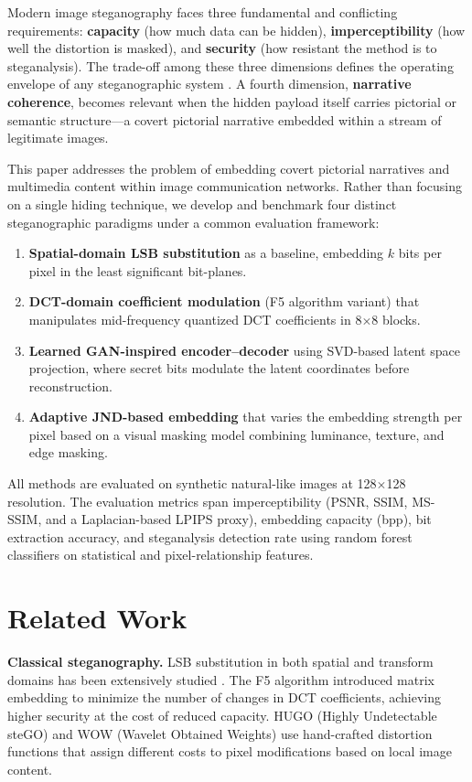 \documentclass[conference]{IEEEtran}
\begin{document}
Modern image steganography faces three fundamental and conflicting requirements: \textbf{capacity} (how much data can be hidden), \textbf{imperceptibility} (how well the distortion is masked), and \textbf{security} (how resistant the method is to steganalysis). The trade-off among these three dimensions defines the operating envelope of any steganographic system \cite{5}. A fourth dimension, \textbf{narrative coherence}, becomes relevant when the hidden payload itself carries pictorial or semantic structure---a covert pictorial narrative embedded within a stream of legitimate images.

This paper addresses the problem of embedding covert pictorial narratives and multimedia content within image communication networks. Rather than focusing on a single hiding technique, we develop and benchmark four distinct steganographic paradigms under a common evaluation framework:

\begin{enumerate}
    \item \textbf{Spatial-domain LSB substitution} as a baseline, embedding $k$ bits per pixel in the least significant bit-planes.
    \item \textbf{DCT-domain coefficient modulation} (F5 algorithm variant) that manipulates mid-frequency quantized DCT coefficients in 8$\times$8 blocks.
    \item \textbf{Learned GAN-inspired encoder--decoder} using SVD-based latent space projection, where secret bits modulate the latent coordinates before reconstruction.
    \item \textbf{Adaptive JND-based embedding} that varies the embedding strength per pixel based on a visual masking model combining luminance, texture, and edge masking.
\end{enumerate}

All methods are evaluated on synthetic natural-like images at 128$\times$128 resolution. The evaluation metrics span imperceptibility (PSNR, SSIM, MS-SSIM, and a Laplacian-based LPIPS proxy), embedding capacity (bpp), bit extraction accuracy, and steganalysis detection rate using random forest classifiers on statistical and pixel-relationship features.

\section{Related Work}
\label{sec:related}

\textbf{Classical steganography.} LSB substitution in both spatial and transform domains has been extensively studied \cite{6}. The F5 algorithm \cite{7} introduced matrix embedding to minimize the number of changes in DCT coefficients, achieving higher security at the cost of reduced capacity. HUGO (Highly Undetectable steGO) \cite{8} and WOW (Wavelet Obtained Weights) \cite{9} use hand-crafted distortion functions that assign different costs to pixel modifications based on local image content.
\end{document}
